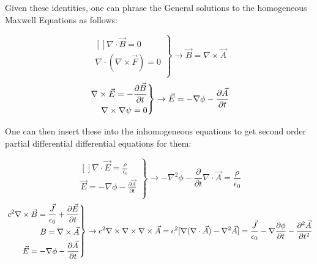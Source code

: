 \documentclass[a4]{article}
\begin{document}
    Given these identities, one can phrase the General solutions to the homogeneous Maxwell Equations as follows:

    \begin{framed}
        \begin{equation}
            \left. \begin{aligned}[]
                \nabla \cdot \vec{B} = 0 \\
                \nabla \cdot (\nabla \times \vec{F}) = 0  \\
            \end{aligned}
            \right\} \rightarrow \vec{B} = \nabla \times \vec{A}
        \end{equation}
        \begin{equation}
            \\
            \left. \begin{aligned}[]
                \nabla \times \vec{E} = - \frac{\partial \vec{B}}{\partial t} \\
                \nabla \times \nabla \psi = 0
            \end{aligned} 
            \right\} \rightarrow \vec{E} = -\nabla \phi - \frac{\partial \vec{A}}{\partial t}
        \end{equation}
    \end{framed}

    One can then insert these into the inhomogeneous equations to get second order partial differential differential equations for them:

    \begin{framed}
        \begin{equation}
            \left. \begin{aligned}[]
                \nabla \cdot \vec{E} = \frac{\rho}{\epsilon_0} \\
                \vec{E} = - \nabla \phi - \frac{\partial \vec{A}}{\partial t}  \\
            \end{aligned}
            \right\} \rightarrow - \nabla^2 \phi - \frac{\partial}{\partial t} \nabla \cdot \vec{A} = \frac{\rho}{\epsilon_0}
        \end{equation}
        \begin{equation}
            \\
            \left. \begin{aligned}[]
                c^2 \nabla \times \vec{B} = \frac{\vec{J}}{\epsilon_0} + \frac{\partial \vec{E}}{\partial t} \\
                B = \nabla \times \vec{A} \\
                \vec{E} = - \nabla \phi - \frac{\partial \vec{A}}{\partial t}
            \end{aligned} 
            \right\} \rightarrow c^2 \nabla \times \nabla \times \nabla \times \vec{A} = c^2 [\nabla (\nabla \cdot \vec{A}) - \nabla^2 \vec{A}] = \frac{\vec{J}}{\epsilon_0} - \nabla \frac{\partial \phi}{\partial t} - \frac{\partial^2 \vec{A}}{\partial t^2}
        \end{equation}
    \end{framed}
\end{document}
